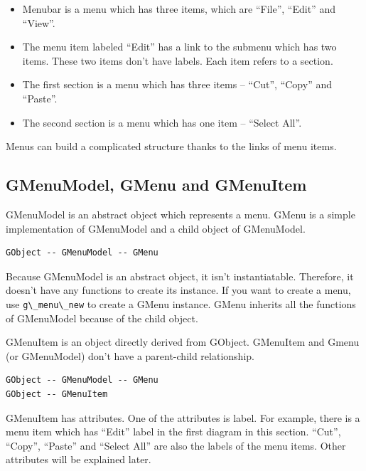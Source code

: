 \begin{itemize}
\tightlist
\item
  Menubar is a menu which has three items, which are ``File'', ``Edit''
  and ``View''.
\item
  The menu item labeled ``Edit'' has a link to the submenu which has two
  items. These two items don't have labels. Each item refers to a
  section.
\item
  The first section is a menu which has three items -- ``Cut'', ``Copy''
  and ``Paste''.
\item
  The second section is a menu which has one item -- ``Select All''.
\end{itemize}

Menus can build a complicated structure thanks to the links of menu
items.

\hypertarget{gmenumodel-gmenu-and-gmenuitem}{%
\subsection{GMenuModel, GMenu and
GMenuItem}\label{gmenumodel-gmenu-and-gmenuitem}}

GMenuModel is an abstract object which represents a menu. GMenu is a
simple implementation of GMenuModel and a child object of GMenuModel.

\begin{lstlisting}
GObject -- GMenuModel -- GMenu
\end{lstlisting}

Because GMenuModel is an abstract object, it isn't instantiatable.
Therefore, it doesn't have any functions to create its instance. If you
want to create a menu, use \passthrough{\lstinline!g\_menu\_new!} to
create a GMenu instance. GMenu inherits all the functions of GMenuModel
because of the child object.

GMenuItem is an object directly derived from GObject. GMenuItem and
Gmenu (or GMenuModel) don't have a parent-child relationship.

\begin{lstlisting}
GObject -- GMenuModel -- GMenu
GObject -- GMenuItem
\end{lstlisting}

GMenuItem has attributes. One of the attributes is label. For example,
there is a menu item which has ``Edit'' label in the first diagram in
this section. ``Cut'', ``Copy'', ``Paste'' and ``Select All'' are also
the labels of the menu items. Other attributes will be explained later.

